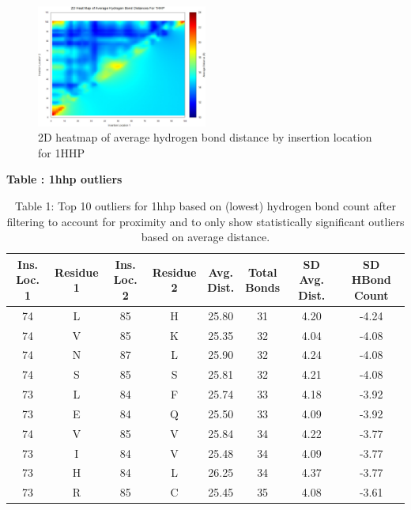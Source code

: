 \documentclass[sigconf, screen, authorversion, authoraddress=false, oneside]{acmart}
\begin{document}
\begin{figure}[ht]
    \centering
    \includegraphics[width=0.5\textwidth]{heatmap_1hhp_all_recrop.jpeg} 
    \caption{2D heatmap of average hydrogen bond distance by insertion location for 1HHP}
    \label{fig:Figure5}
\end{figure}

\begin{table}[!ht] %
    \centering
    \textbf{\large Table \thetable: 1hhp outliers} \\[1ex]
    {\small
    \setlength{\tabcolsep}{2pt} %
    \begin{tabular}{cccccccc}
    \toprule
    \makecell{Ins.\\Loc. 1} & 
    \makecell{Residue\\1} & 
    \makecell{Ins.\\Loc. 2} & 
    \makecell{Residue\\2} & 
    \makecell{Avg.\\Dist.} & 
    \makecell{Total\\Bonds} & 
    \makecell{SD Avg.\\Dist.} & 
    \makecell{SD HBond\\Count} \\
    \midrule
    74 & L & 85 & H & 25.80 & 31 & 4.20 & -4.24 \\
    74 & V & 85 & K & 25.35 & 32 & 4.04 & -4.08 \\
    74 & N & 87 & L & 25.90 & 32 & 4.24 & -4.08 \\
    74 & S & 85 & S & 25.81 & 32 & 4.21 & -4.08 \\
    73 & L & 84 & F & 25.74 & 33 & 4.18 & -3.92 \\
    73 & E & 84 & Q & 25.50 & 33 & 4.09 & -3.92 \\
    74 & V & 85 & V & 25.84 & 34 & 4.22 & -3.77 \\
    73 & I & 84 & V & 25.48 & 34 & 4.09 & -3.77 \\
    73 & H & 84 & L & 26.25 & 34 & 4.37 & -3.77 \\
    73 & R & 85 & C & 25.45 & 35 & 4.08 & -3.61 \\
    \bottomrule
    \end{tabular}
    }
    \caption*{Table 1: Top 10 outliers for 1hhp based on (lowest) hydrogen bond count after filtering to account for proximity and to only show statistically significant outliers based on average distance.}
    \label{table:1}
\end{table}
\end{document}
